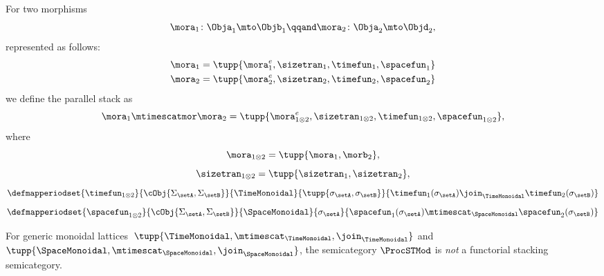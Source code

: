 \begin{lemma}
    For two morphisms
    \begin{equation}
        \mora_1 \colon \Obja_1 \mto \Objb_1
        \qqand
        \mora_2 \colon \Obja_2 \mto \Objd_2,
    \end{equation}
    represented as follows:
    \begin{align}
        \mora_1 & = \tupp{\mora^e_1, \sizetran_1,  \timefun_1,
        \spacefun_{1}  } \\
        \mora_2 & = \tupp{\mora^e_2, \sizetran_2,  \timefun_2, \spacefun_{2} }
    \end{align}
    we define the parallel stack as
    \begin{equation}
        \mora_1 \mtimescatmor \mora_2 = \tupp{
        \mora^e_{1\otimes2},
        \sizetran_{1\otimes2},
        \timefun_{1\otimes2},
        \spacefun_{1\otimes2}
        },
    \end{equation}
    where
    \begin{equation}
        \mora_{1\otimes2} = \tupp{\mora_1, \morb_2},
    \end{equation}
    \begin{equation}
        \sizetran_{1\otimes2} =  \tupp{\sizetran_1, \sizetran_2},
    \end{equation}
    \begin{equation}
        \defmapperiodset{
            \timefun_{1\otimes 2}
        }{
            \cObj {\Sigma_{\setA}, \Sigma_{\setB}}
        }{
            \TimeMonoidal
        }{
            \tupp{\sigma_{\setA}, \sigma_{\setB}}
        }{
            \timefun_1(\sigma_{\setA}) \join_{\TimeMonoidal} \timefun_2(\sigma_{\setB})
        }
    \end{equation}
    \begin{equation}
        \defmapperiodset{
            \spacefun_{1\otimes2}
        }{
            \cObj {\Sigma_{\setA}, \Sigma_{\setB}}
        }{
            \SpaceMonoidal
        }{
            \sigma_{\setA}
        }{
            \spacefun_1(\sigma_{\setA}) \mtimescat_{\SpaceMonoidal} \spacefun_2(\sigma_{\setB})
        }
    \end{equation}
\end{lemma}

\begin{lemma}
    For generic monoidal lattices~$\tupp{\TimeMonoidal, \mtimescat_{\TimeMonoidal}, \join_{\TimeMonoidal}}$ and $\tupp{\SpaceMonoidal, \mtimescat_{\SpaceMonoidal}, \join_{\SpaceMonoidal}}$, the semicategory $\ProcSTMod$  is \emph{not} a functorial stacking semicategory.
\end{lemma}

